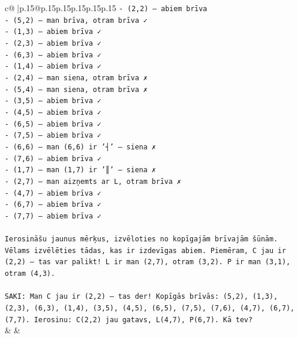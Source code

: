 \documentclass{article}
\begin{document}
{\begin{supertabular}{c@{$\;$}|p{.15\linewidth}@{}p{.15\linewidth}p{.15\linewidth}p{.15\linewidth}p{.15\linewidth}p{.15\linewidth}}
{{{\texttt{{-} (2,2) — abiem brīva} \\
\texttt{{-} (5,2) — man brīva, otram brīva ✓} \\
\texttt{{-} (1,3) — abiem brīva ✓} \\
\texttt{{-} (2,3) — abiem brīva ✓} \\
\texttt{{-} (6,3) — abiem brīva ✓} \\
\texttt{{-} (1,4) — abiem brīva ✓} \\
\texttt{{-} (2,4) — man siena, otram brīva ✗} \\
\texttt{{-} (5,4) — man siena, otram brīva ✗} \\
\texttt{{-} (3,5) — abiem brīva ✓} \\
\texttt{{-} (4,5) — abiem brīva ✓} \\
\texttt{{-} (6,5) — abiem brīva ✓} \\
\texttt{{-} (7,5) — abiem brīva ✓} \\
\texttt{{-} (6,6) — man (6,6) ir '┤' — siena ✗} \\
\texttt{{-} (7,6) — abiem brīva ✓} \\
\texttt{{-} (1,7) — man (1,7) ir '║' — siena ✗} \\
\texttt{{-} (2,7) — man aizņemts ar L, otram brīva ✗} \\
\texttt{{-} (4,7) — abiem brīva ✓} \\
\texttt{{-} (6,7) — abiem brīva ✓} \\
\texttt{{-} (7,7) — abiem brīva ✓} \\
\\ 
\texttt{Ierosināšu jaunus mērķus, izvēloties no kopīgajām brīvajām šūnām. Vēlams izvēlēties tādas, kas ir izdevīgas abiem. Piemēram, C jau ir (2,2) — tas var palikt! L ir man (2,7), otram (3,2). P ir man (3,1), otram (4,3).} \\
\\ 
\texttt{SAKI: Man C jau ir (2,2) — tas der! Kopīgās brīvās: (5,2), (1,3), (2,3), (6,3), (1,4), (3,5), (4,5), (6,5), (7,5), (7,6), (4,7), (6,7), (7,7). Ierosinu: C(2,2) jau gatavs, L(4,7), P(6,7). Kā tev?} \\
            }
        }
    }
    & & \\ \\


\end{supertabular}}
\end{document}
